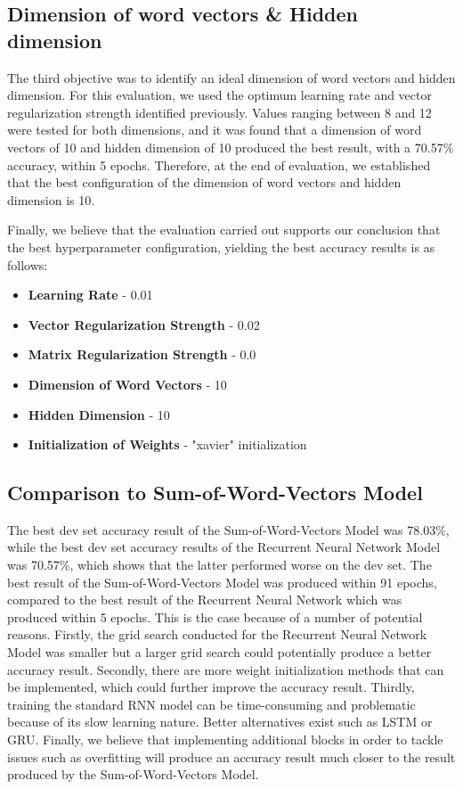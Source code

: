 \documentclass{article} %
\begin{document}
\subsection*{Dimension of word vectors \& Hidden dimension}

The third objective was to identify an ideal dimension of word vectors and hidden dimension. For this evaluation, we used the optimum learning rate and vector regularization strength identified previously. Values ranging between 8 and 12 were tested for both dimensions, and it was found that a dimension of word vectors of 10 and hidden dimension of 10 produced the best result, with a 70.57\% accuracy, within 5 epochs. Therefore, at the end of evaluation, we established that the best configuration of the dimension of word vectors and hidden dimension is 10.

Finally, we believe that the evaluation carried out supports our conclusion that the best hyperparameter configuration, yielding the best accuracy results is as follows: 
\begin{itemize}
\item \textbf{Learning Rate} - 0.01
\item \textbf{Vector Regularization Strength} - 0.02
\item \textbf{Matrix Regularization Strength} - 0.0
\item \textbf{Dimension of Word Vectors} - 10
\item \textbf{Hidden Dimension} - 10
\item \textbf{Initialization of Weights} - "xavier" initialization
\end{itemize}

\subsection*{Comparison to Sum-of-Word-Vectors Model}

The best dev set accuracy result of the Sum-of-Word-Vectors Model was 78.03\%, while the best dev set accuracy results of the Recurrent Neural Network Model was 70.57\%, which shows that the latter performed worse on the dev set. The best result of the Sum-of-Word-Vectors Model was produced within 91 epochs, compared to the best result of the Recurrent Neural Network which was produced within 5 epochs. This is the case because of a number of potential reasons. Firstly, the grid search conducted for the Recurrent Neural Network Model was smaller but a larger grid search could potentially produce a better accuracy result. Secondly, there are more weight initialization methods that can be implemented, which could further improve the accuracy result. Thirdly, training the standard RNN model can be time-consuming and problematic \cite{pascanu2012difficulty} because of its slow learning nature. Better alternatives exist such as LSTM or GRU. Finally, we believe that implementing additional blocks in order to tackle issues such as overfitting will produce an accuracy result much closer to the result produced by the Sum-of-Word-Vectors Model.
\end{document}

